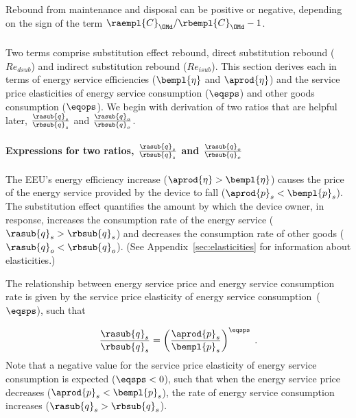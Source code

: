 Rebound from maintenance and disposal can be positive or negative,
depending on the sign of the term $\raempl{C}_{\OMd}/\rbempl{C}_{\OMd} - 1$.


\subsubsection{\Subeffect{}} 
\label{sec:Re_sub}

Two terms comprise substitution effect rebound,
direct substitution rebound ($Re_{dsub}$) and
indirect substitution rebound ($Re_{isub}$).
This section derives each in terms of 
energy service efficiencies ($\bempl{\eta}$ and $\aprod{\eta}$) and
the service price elasticities 
of energy service consumption ($\eqsps$) and
other goods consumption ($\eqops$).
We begin with derivation of two ratios that are helpful later,
$\frac{\rasub{q}_s}{\rbsub{q}_s}$ and
$\frac{\rasub{q}_o}{\rbsub{q}_o}$.


\paragraph{Expressions for two ratios, $\frac{\rasub{q}_s}{\rbsub{q}_s}$ and $\frac{\rasub{q}_o}{\rbsub{q}_o}$}
\label{sec:two_ratios}

The EEU's energy efficiency increase
($\aprod{\eta} > \bempl{\eta}$)
causes the price of the energy service provided by the device to fall
($\aprod{p}_s < \bempl{p}_s$).
The substitution effect quantifies the amount by which
the device owner, in response,
increases the consumption rate of the energy service ($\rasub{q}_s > \rbsub{q}_s$) and
decreases the consumption rate of other goods ($\rasub{q}_o < \rbsub{q}_o$).
(See Appendix~\ref{sec:elasticities} for information about elasticities.)

The relationship between energy service price and energy service consumption rate
is given by the service price elasticity of energy service consumption~($\eqsps$),
such that

\begin{equation}
  \frac{\rasub{q}_s}{\rbsub{q}_s} = \left( \frac{\aprod{p}_s}{\bempl{p}_s} \right)^{\eqsps} \; .
\end{equation}
%
Note that a negative value for the service price elasticity of energy service consumption
is expected ($\eqsps < 0$),
such that when the energy service price decreases ($\aprod{p}_s < \bempl{p}_s$),
the rate of energy service consumption increases ($\rasub{q}_s > \rbsub{q}_s$).

